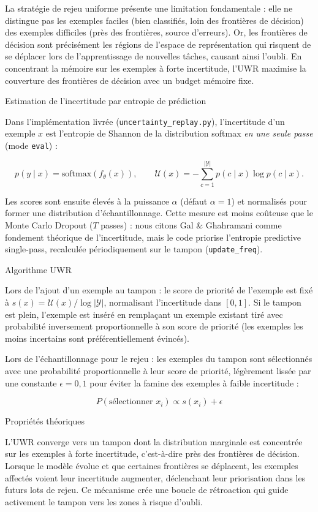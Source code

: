 La stratégie de rejeu uniforme présente une limitation fondamentale : elle ne distingue pas les exemples faciles (bien classifiés, loin des frontières de décision) des exemples difficiles (près des frontières, source d'erreurs). Or, les frontières de décision sont précisément les régions de l'espace de représentation qui risquent de se déplacer lors de l'apprentissage de nouvelles tâches, causant ainsi l'oubli. En concentrant la mémoire sur les exemples à forte incertitude, l'UWR maximise la couverture des frontières de décision avec un budget mémoire fixe.

Estimation de l'incertitude par entropie de prédiction

Dans l'implémentation livrée (\texttt{uncertainty\_replay.py}), l'incertitude d'un exemple $x$ est l'entropie de Shannon de la distribution softmax \emph{en une seule passe} (mode \texttt{eval}) :

$$p(y \mid x) = \mathrm{softmax}(f_\theta(x)), \qquad
\mathcal{U}(x) = -\sum_{c=1}^{|\mathcal{Y}|} p(c \mid x) \log p(c \mid x).$$

Les scores sont ensuite élevés à la puissance $\alpha$ (défaut $\alpha=1$) et normalisés pour former une distribution d'échantillonnage. Cette mesure est moins coûteuse que le Monte Carlo Dropout \parencite{gal2016} ($T$ passes) : nous citons Gal \& Ghahramani comme fondement théorique de l'incertitude, mais le code priorise l'entropie predictive single-pass, recalculée périodiquement sur le tampon (\texttt{update\_freq}).

Algorithme UWR

Lors de l'ajout d'un exemple au tampon : le score de priorité de l'exemple est fixé à $s(x) = \mathcal{U}(x) / \log |\mathcal{Y}|$, normalisant l'incertitude dans $[0, 1]$. Si le tampon est plein, l'exemple est inséré en remplaçant un exemple existant tiré avec probabilité inversement proportionnelle à son score de priorité (les exemples les moins incertains sont préférentiellement évincés).

Lors de l'échantillonnage pour le rejeu : les exemples du tampon sont sélectionnés avec une probabilité proportionnelle à leur score de priorité, légèrement lissée par une constante $\epsilon = 0{,}1$ pour éviter la famine des exemples à faible incertitude :

$$P(\text{sélectionner } x_i) \propto s(x_i) + \epsilon$$

Propriétés théoriques

L'UWR converge vers un tampon dont la distribution marginale est concentrée sur les exemples à forte incertitude, c'est-à-dire près des frontières de décision. Lorsque le modèle évolue et que certaines frontières se déplacent, les exemples affectés voient leur incertitude augmenter, déclenchant leur priorisation dans les futurs lots de rejeu. Ce mécanisme crée une boucle de rétroaction qui guide activement le tampon vers les zones à risque d'oubli.

